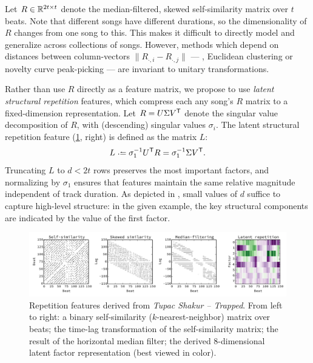 \documentclass{article}
\begin{document}
Let $R \in \mathbb{R}^{2t \times t}$ denote the median-filtered, skewed self-similarity matrix over $t$ beats.  
Note that different songs have different durations, so the dimensionality of $R$ changes from one song to this. 
This makes it difficult to directly model and generalize across collections of songs.
However, methods which depend on distances between column-vectors ${\|R_{\cdot, i} - R_{\cdot, j}\|}$ --- 
\eg, Euclidean clustering or novelty curve peak-picking --- are invariant to unitary transformations.

Rather than use $R$ directly as a feature matrix, we propose to use \emph{latent structural repetition} features, which compress each
any song's $R$ matrix to a fixed-dimension representation.  Let $R = U\Sigma V^\mathsf{T}$ denote the singular value decomposition of $R$,
with (descending) singular values $\sigma_i$. The latent structural repetition feature (\cref{fig:rep}, right) is defined as the 
matrix $L$:
\begin{equation}
L \defeq \sigma_1^{-1} U\trans R = \sigma_1^{-1} \Sigma V\trans.\label{eq:latent-rep}
\end{equation}
Truncating $L$ to $d < 2t$ rows preserves the most important factors, and normalizing by $\sigma_1$ ensures that
features maintain the same relative magnitude independent of track duration.  As depicted in , small values of $d$
suffice to capture high-level structure: in the given example, the key structural components are indicated by the value of the first
factor.

\begin{figure}[t]
\centering%
\includegraphics[width=\textwidth]{figs/rep}
\vspace{-2\baselineskip}
\caption{Repetition features derived from \emph{Tupac Shakur -- Trapped}. 
From left to right: a binary self-similarity ($k$-nearest-neighbor) 
matrix over beats; 
the time-lag transformation of the self-similarity matrix; 
the result of the horizontal median filter;
the derived 8-dimensional latent factor representation (best viewed in color).\label{fig:rep}}
\end{figure}
\end{document}
